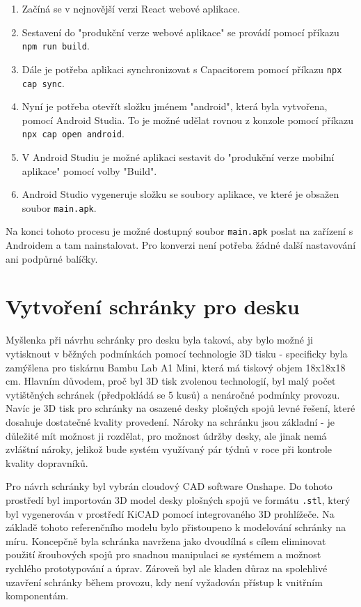 \begin{enumerate}
	\item Začíná se v nejnovější verzi React webové aplikace.
	\item Sestavení do "produkční verze webové aplikace" se provádí pomocí příkazu \texttt{npm run build}.
	\item Dále je potřeba aplikaci synchronizovat s Capacitorem pomocí příkazu \texttt{npx cap sync}.
	\item Nyní je potřeba otevřít složku jménem "android", která byla vytvořena, pomocí Android Studia. To je možné udělat rovnou z konzole pomocí příkazu \texttt{npx cap open android}.
	\item V Android Studiu je možné aplikaci sestavit do "produkční verze mobilní aplikace" pomocí volby "Build".
	\item Android Studio vygeneruje složku se soubory aplikace, ve které je obsažen soubor \texttt{main.apk}.
\end{enumerate}

Na konci tohoto procesu je možné dostupný soubor \texttt{main.apk} poslat na zařízení s Androidem a tam nainstalovat. Pro konverzi není potřeba žádné další nastavování ani podpůrné balíčky.

\section{Vytvoření schránky pro desku}

Myšlenka při návrhu schránky pro desku byla taková, aby bylo možné ji vytisknout v běžných podmínkách pomocí technologie 3D tisku - specificky byla zamýšlena pro tiskárnu Bambu Lab A1 Mini, která má tiskový objem 18x18x18 cm. Hlavním důvodem, proč byl 3D tisk zvolenou technologií, byl malý počet vytištěných schránek (předpokládá se 5 kusů) a nenáročné podmínky provozu. Navíc je 3D tisk pro schránky na osazené desky plošných spojů levné řešení, které dosahuje dostatečné kvality provedení. Nároky na schránku jsou základní - je důležité mít možnost ji rozdělat, pro možnost údržby desky, ale jinak nemá zvláštní nároky, jelikož bude systém využívaný pár týdnů v roce při kontrole kvality dopravníků.

Pro návrh schránky byl vybrán cloudový CAD software Onshape. Do tohoto prostředí byl importován 3D model desky plošných spojů ve formátu \texttt{.stl}, který byl vygenerován v prostředí KiCAD pomocí integrovaného 3D prohlížeče. Na základě tohoto referenčního modelu bylo přistoupeno k modelování schránky na míru. Koncepčně byla schránka navržena jako dvoudílná s cílem eliminovat použití šroubových spojů pro snadnou manipulaci se systémem a možnost rychlého prototypování a úprav. Zároveň byl ale kladen důraz na spolehlivé uzavření schránky během provozu, kdy není vyžadován přístup k vnitřním komponentám.

